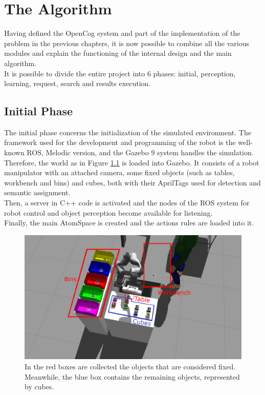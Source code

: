 
\chapter{The Algorithm} \label{cha:algorithm}

Having defined the OpenCog system and part of the implementation of the problem in the previous chapters, it is now possible to combine all the various modules and explain the functioning of the internal design and the main algorithm. \\

It is possible to divide the entire project into 6 phases: initial, perception, learning, request, search and results execution.  

\section{Initial Phase}\label{sec:init}

The initial phase concerns the initialization of the simulated environment. The framework used for the development and programming of the robot is the well-known ROS, Melodic version, and the Gazebo 9 system handles the simulation. \\
Therefore, the world as in Figure \ref{fig:env_2_named} is loaded into Gazebo. 
It consists of a robot manipulator with an attached camera, some fixed objects (such as tables, workbench and bins) and cubes, both with their AprilTags used for detection and semantic assignment. \\
Then, a server in C++ code is activated and the nodes of the ROS system for robot control and object perception become available for listening. \\
Finally, the main AtomSpace is created and the actions rules are loaded into it. 

\begin{figure} [h]
\centering
\includegraphics[width=1.0
\textwidth]{figures/Magistrale/env_objs}
\caption[Environment Components Description]{ In the red boxes are collected the objects that are considered fixed. Meanwhile, the blue box contains the remaining objects, represented by cubes.
\label{fig:env_2_named}}
\end{figure} 


